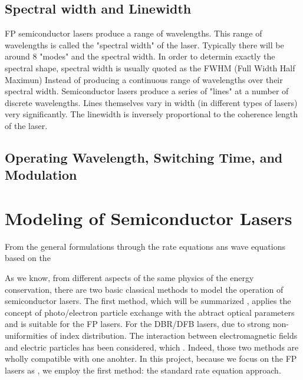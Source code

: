\subsection{Spectral width and Linewidth}

FP semiconductor lasers produce a range of wavelengths. This range of
wavelengths is called the "spectral width" of the laser. Typically there will
be around 8 "modes" and the spectral width. In order to determin exactly the
spectral shape, spectral width is usually quoted as the FWHM (Full Width Half
Maximun) Instead of producing a continuous range of wavelengths over their
spectral width. Semiconductor lasers produce a series of "lines" at a number of
discrete wavelengths. Lines themselves vary in width (in different types of
lasers) very significantly. The linewidth is inversely proportional to the
coherence length of the laser.

\subsection{Operating Wavelength, Switching Time, and Modulation}
\section{Modeling of Semiconductor Lasers} \label{corrections}

From the general formulations through the rate equations ans wave equations
based on the

As we know, from different aspects of the same physics of the energy
conservation, there are two basic classical methods to model the operation of
semiconductor lasers. The first method, which will be summarized , applies the
concept of photo/electron particle exchange with the abtract optical parameters
and is suitable for the FP lasers. For the DBR/DFB lasers, due to strong
non-uniformities of index distribution. The interaction between electromagnetic
fields and electric particles has been considered, which . Indeed, those two
methods are wholly compatible with one anohter. In this project, because we
focus on the FP lasers as , we employ the first method: the standard rate
equation approach.

